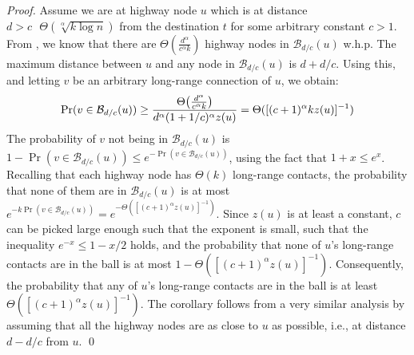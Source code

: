 \begin{proof}
	Assume we are at highway node $u$ which is at distance $d > c \text{ }
	\Theta(\sqrt[\alpha]{k \log{n}})$ from the destination $t$ for some
	arbitrary constant $c > 1$.
	From , we know that there are
	$\Theta(\frac{d^\alpha}{c^\alpha k})$ highway nodes in
	$\mathcal{B}_{d/c}(u)$ w.h.p.
	The maximum distance between $u$ and any node in $\mathcal{B}_{d/c}(u)$ is
	$d + d/c$.
	Using this, and letting $v$ be an arbitrary long-range connection of $u$,
	we obtain:
	\begin{equation*}
		\Pr(v \in \mathcal{B}_{d/c}(u)) \geq \frac{\Theta\pars*{\frac{ d^\alpha}{c^\alpha k}}}{d^\alpha (1 + 1/c)^\alpha z(u)} = \Theta([(c + 1)^\alpha k z(u) ]^{-1})%
	\end{equation*}
	The probability of $v$ not being in $\mathcal{B}_{d/c}(u)$ is
	$1 - \Pr(v \in \mathcal{B}_{d/c}(u)) \leq e^{-\Pr(v \in
	\mathcal{B}_{d/c}(u))}$, using the fact that $1 + x \leq e^x$.
	Recalling that each highway node has $\Theta(k)$ long-range contacts,
	the probability that none of them are in $\mathcal{B}_{d/c}(u)$ is at most
	$e^{-k \Pr(v \in \mathcal{B}_{d/c}(u))} = e^{-\Theta([(c + 1)^\alpha
	z(u)]^{-1})}$.
	Since $z(u)$ is at least a constant, $c$ can be picked large enough such
	that the exponent is small, such that the inequality $e^{-x} \leq 1 - x/2$
	holds, and the probability that none of $u$'s long-range contacts are
	in the ball is at most $1 - \Theta([(c + 1)^\alpha
	z(u)]^{-1})$.
	Consequently, the probability that any of $u$'s long-range contacts
	are in the ball is at least $\Theta([(c + 1)^\alpha z(u)]^{-1})$.
	The corollary follows from a very similar analysis by assuming that all the
	highway nodes are as close to $u$ as possible, i.e., at distance $d - d/c$
	from $u$.
	\qed
\end{proof}
\vspace*{-\medskipamount}
\vspace*{-\medskipamount}
